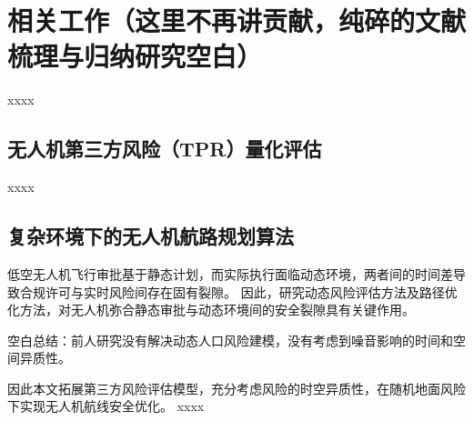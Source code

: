 
\section{相关工作（这里不再讲贡献，纯碎的文献梳理与归纳研究空白）}
\label{sec:related_work}

xxxx

\subsection{无人机第三方风险（TPR）量化评估}

xxxx


\subsection{复杂环境下的无人机航路规划算法}



低空无人机飞行审批基于静态计划，而实际执行面临动态环境，两者间的时间差导致合规许可与实时风险间存在固有裂隙。
因此，研究动态风险评估方法及路径优化方法，对无人机弥合静态审批与动态环境间的安全裂隙具有关键作用。

空白总结：前人研究没有解决动态人口风险建模，没有考虑到噪音影响的时间和空间异质性。

因此本文拓展第三方风险评估模型，充分考虑风险的时空异质性，在随机地面风险下实现无人机航线安全优化。
xxxx
